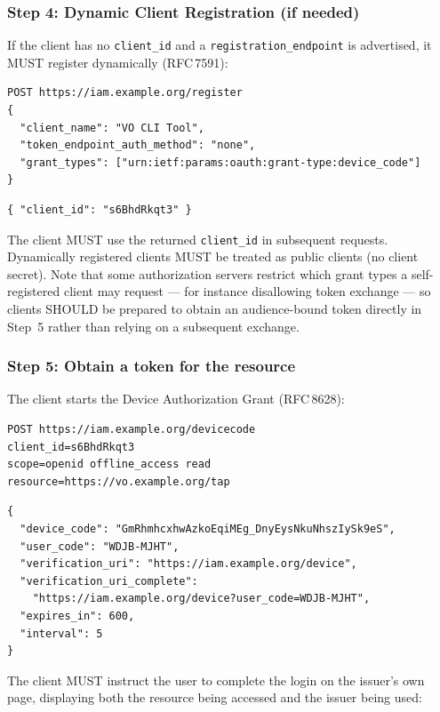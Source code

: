 \documentclass[11pt,a4paper]{ivoa}
\newcommand{\rfc}[1]{RFC\,#1}
\begin{document}
\subsubsection{Step 4: Dynamic Client Registration (if needed)}

If the client has no \verb|client_id| and a \verb|registration_endpoint| is
advertised, it MUST register dynamically (\rfc{7591}):

\begin{verbatim}
POST https://iam.example.org/register
{
  "client_name": "VO CLI Tool",
  "token_endpoint_auth_method": "none",
  "grant_types": ["urn:ietf:params:oauth:grant-type:device_code"]
}
\end{verbatim}

\begin{verbatim}
{ "client_id": "s6BhdRkqt3" }
\end{verbatim}

The client MUST use the returned \verb|client_id| in subsequent requests.
Dynamically registered clients MUST be treated as public clients (no client
secret). Note that some authorization servers restrict which grant types a
self-registered client may request --- for instance disallowing token exchange
--- so clients SHOULD be prepared to obtain an audience-bound token directly in
Step~5 rather than relying on a subsequent exchange.

\subsubsection{Step 5: Obtain a token for the resource}

The client starts the Device Authorization Grant (\rfc{8628}):

\begin{verbatim}
POST https://iam.example.org/devicecode
client_id=s6BhdRkqt3
scope=openid offline_access read
resource=https://vo.example.org/tap
\end{verbatim}

\begin{verbatim}
{
  "device_code": "GmRhmhcxhwAzkoEqiMEg_DnyEysNkuNhszIySk9eS",
  "user_code": "WDJB-MJHT",
  "verification_uri": "https://iam.example.org/device",
  "verification_uri_complete":
    "https://iam.example.org/device?user_code=WDJB-MJHT",
  "expires_in": 600,
  "interval": 5
}
\end{verbatim}

The client MUST instruct the user to complete the login on the issuer's own
page, displaying both the resource being accessed and the issuer being used:
\end{document}
